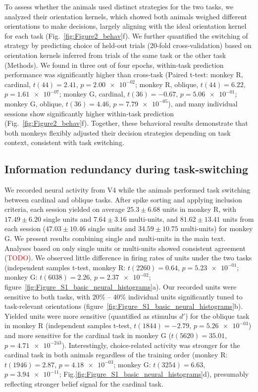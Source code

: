 \documentclass[lineno,pdflatex,sn-basic]{sn-jnl}%
\theoremstyle{thmstyleone}%
\theoremstyle{thmstyletwo}%
\theoremstyle{thmstylethree}%
\begin{document}
To assess whether the animals used distinct strategies for the two tasks, we analyzed their orientation kernels, which showed both animals weighed different orientations to make decisions, largely aligning with the ideal orientation kernel for each task (Fig.~\ref{fig:Figure2_behav}f). We further quantified the switching of strategy by predicting choice of held-out trials (20-fold cross-validation) based on orientation kernels inferred from trials of the same task or the other task (Methods). We found in three out of four epochs, within-task prediction performance was significantly higher than cross-task (Paired t-test: monkey R, cardinal, $t(44) = 2.41$, $p = \num{2.00e-02}$; monkey R, oblique, $t(44) = 6.22$, $p = \num{1.61e-07}$; monkey G, cardinal, $t(36) = -0.67$, $p = \num{5.06e-01}$; monkey G, oblique, $t(36) = 4.46$, $p = \num{7.79e-05}$), and many individual sessions show significantly higher within-task prediction (Fig.~\ref{fig:Figure2_behav}f). Together, these behavioral results demonstrate that both monkeys flexibly adjusted their decision strategies depending on task context, consistent with task switching.


\subsection{Information redundancy during task-switching}

We recorded neural activity from V4 while the animals performed task switching between cardinal and oblique tasks. After spike sorting and applying inclusion criteria, each session yielded on average $25.3\pm6.68$ units in monkey R, with $17.49 \pm 6.20$ single units and $7.64 \pm 3.16$ multi-units, and $81.62\pm13.41$ units from each session ($47.03 \pm 10.46$ single units and $34.59 \pm 10.75$ multi-units) for monkey G.  We present results combining single and multi-units in the main text. Analyses based on only single units or multi-units showed consistent agreement (\textcolor{red}{TODO}). We observed little difference in firing rates of units under the two tasks (independent samples t-test, monkey R: $t(2260) = 0.64$, $p = \num{5.23e-01}$; monkey G: $t(6038) = 2.26$, $p = \num{2.37e-02}$; figure~\ref{fig:Figure_S1_basic_neural_histograms}a). Our recorded units were sensitive to both tasks, with 20\% -- 40\% individual units significantly tuned to task-relevant orientations (figure~\ref{fig:Figure_S1_basic_neural_histograms}b). Yielded units were more sensitive (quantified as stimulus $d'$) for the oblique task in monkey R (independent samples t-test, $t(1844) = -2.79$, $p = \num{5.26e-03}$) and more sensitive for the cardinal task in monkey G ($t(5620) = 35.01$, $p = \num{4.71e-243}$). Interestingly, choice-related activity was stronger for the cardinal task in both animals regardless of the training order (monkey R: $t(1946) = 2.87$, $p = \num{4.18e-03}$; monkey G: $t(3254) = 6.63$, $p = \num{3.94e-11}$; Fig.\ref{fig:Figure_S1_basic_neural_histograms}d), presumably reflecting stronger belief signal for the cardinal task.
\end{document}
